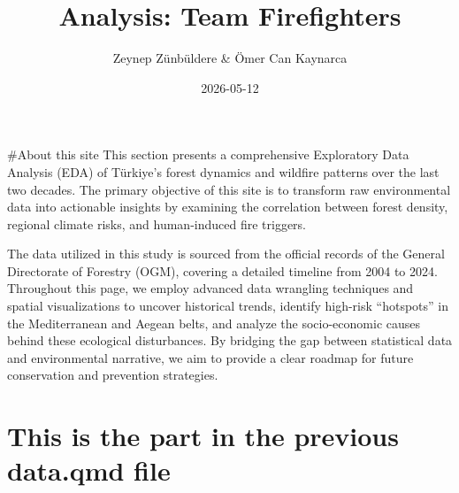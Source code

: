 \documentclass[
  11pt,
  a4paper,
  DIV=11,
  numbers=noendperiod]{scrartcl}
\title{Analysis: Team Firefighters}
\author{Zeynep Zünbüldere \& Ömer Can Kaynarca}
\date{2026-05-12}
\begin{document}
\maketitle


\#About this site This section presents a comprehensive Exploratory Data
Analysis (EDA) of Türkiye's forest dynamics and wildfire patterns over
the last two decades. The primary objective of this site is to transform
raw environmental data into actionable insights by examining the
correlation between forest density, regional climate risks, and
human-induced fire triggers.

The data utilized in this study is sourced from the official records of
the General Directorate of Forestry (OGM), covering a detailed timeline
from 2004 to 2024. Throughout this page, we employ advanced data
wrangling techniques and spatial visualizations to uncover historical
trends, identify high-risk ``hotspots'' in the Mediterranean and Aegean
belts, and analyze the socio-economic causes behind these ecological
disturbances. By bridging the gap between statistical data and
environmental narrative, we aim to provide a clear roadmap for future
conservation and prevention strategies.

\section{This is the part in the previous data.qmd
file}\label{this-is-the-part-in-the-previous-data.qmd-file}
\end{document}
